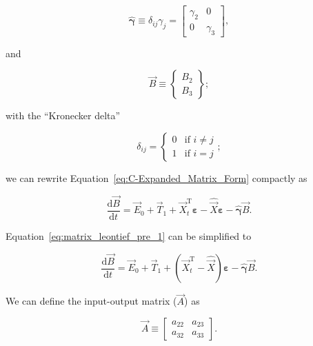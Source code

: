 \begin{equation} \label{eq:gamma_hat_matrix_def}
	\hat{\bm{\gamma}}
	\equiv
	\delta_{ij} \gamma_{j}
	=
	\begin{bmatrix}
		\gamma_{2} & 0         \\
		0          & \gamma_{3}
	\end{bmatrix},
\end{equation}

\noindent{}and

\begin{equation} \label{eq:B_vec_def}
	\vec{B} 
	\equiv
	\begin{Bmatrix}	
		B_{2} \\
		B_{3}
	\end{Bmatrix};
\end{equation}

\noindent{}with the ``Kronecker delta''

\begin{equation}\label{eq:k_delta}
	\delta_{ij} 
	=
	\begin{cases}	
		0	&	\text{if  } i \neq j	\\
		1 	& 	\text{if  } i = j
	\end{cases};
\end{equation}

\noindent{}we can rewrite Equation~\ref{eq:C-Expanded_Matrix_Form}
compactly as

\begin{equation} \label{eq:matrix_leontief_pre_1}
	\frac{\mathrm{d}\vec{B}}{\mathrm{d}t} 
	= \vec{E}_{0}
	+ \vec{T}_{1}
	+ \vec{X}_{t}^{\mathrm{T}}\bm{\varepsilon} 
	- \hat{\vec{X}}\bm{\varepsilon}
	- \hat{\bm{\gamma}}\vec{B}.
\end{equation}

\noindent{}Equation~\ref{eq:matrix_leontief_pre_1} can be simplified to

\begin{equation} \label{eq:matrix_leontief_pre_2}
	\frac{\mathrm{d}\vec{B}}{\mathrm{d}t} 
	= \vec{E}_{0}
	+ \vec{T}_{1}
	+ (\vec{X}_{t}^{\mathrm{T}} - \hat{\vec{X}})\bm{\varepsilon} 
	- \hat{\bm{\gamma}}\vec{B}.
\end{equation}

\noindent{}We can define the input-output matrix ($\vec{A}$) as

\begin{equation} \label{eq:A_matrix_def}
	\vec{A} 
	\equiv
	\begin{bmatrix}
		a_{22} & a_{23}	\\
		a_{32} & a_{33}	
	\end{bmatrix}.
\end{equation} 

